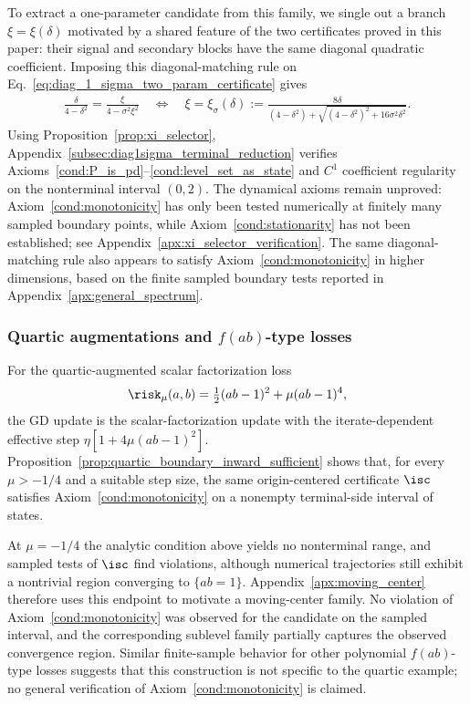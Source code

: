 \documentclass{article}
\begin{document}
To extract a one-parameter candidate from this family, we single out a branch
$\xi=\xi(\delta)$ motivated by a shared feature of the two certificates proved
in this paper: their signal and secondary blocks have the same diagonal
quadratic coefficient. Imposing this diagonal-matching rule on
Eq.~\eqref{eq:diag_1_sigma_two_param_certificate} gives
\begin{align}
    \frac{\delta}{4-\delta^2}=\frac{\xi}{4-\sigma^2\xi^2}
    \quad\Longleftrightarrow\quad
    \xi=\xi_\sigma(\delta)
    :=\frac{8\delta}
        {(4-\delta^2)+\sqrt{(4-\delta^2)^2+16\sigma^2\delta^2}} .
    \label{eq:main_xi_selector}
\end{align}
Using Proposition~\ref{prop:xi_selector},
Appendix~\ref{subsec:diag1sigma_terminal_reduction} verifies
Axioms~\ref{cond:P_is_pd}--\ref{cond:level_set_as_state} and $C^1$ coefficient
regularity on the nonterminal interval $(0,2)$. The dynamical axioms remain
unproved: Axiom~\ref{cond:monotonicity} has only been tested numerically at
finitely many sampled boundary points, while Axiom~\ref{cond:stationarity} has
not been established; see Appendix~\ref{apx:xi_selector_verification}.
The same diagonal-matching rule also appears to satisfy
Axiom~\ref{cond:monotonicity} in higher dimensions, based on the finite sampled
boundary tests reported in Appendix~\ref{apx:general_spectrum}.

\subsubsection{Quartic augmentations and \texorpdfstring{$f(ab)$}{f(ab)}-type losses}

For the quartic-augmented scalar factorization loss
\begin{align}
    \risk_\mu(a,b)
    =
    \tfrac12(ab-1)^2+\mu(ab-1)^4,
\end{align}
the GD update is the scalar-factorization update with the iterate-dependent
effective step $\eta[1+4\mu(ab-1)^2]$.
Proposition~\ref{prop:quartic_boundary_inward_sufficient} shows that, for every
$\mu>-1/4$ and a suitable step size, the same origin-centered certificate
$\isc$ satisfies Axiom~\ref{cond:monotonicity} on a nonempty terminal-side
interval of states.

At $\mu=-1/4$ the analytic condition above yields no nonterminal range, and
sampled tests of $\isc$ find violations, although numerical trajectories still
exhibit a nontrivial region converging to $\{ab=1\}$. Appendix~\ref{apx:moving_center}
therefore uses this endpoint to motivate a moving-center family. No violation
of Axiom~\ref{cond:monotonicity} was observed for the candidate on the sampled
interval, and the corresponding sublevel family partially captures the
observed convergence region.
Similar finite-sample behavior for other polynomial $f(ab)$-type losses
suggests that this construction is not specific to the quartic example; no
general verification of Axiom~\ref{cond:monotonicity} is claimed.
\end{document}
